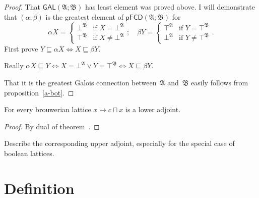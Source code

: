 \begin{proof}
That $\mathsf{GAL} (\mathfrak{A}; \mathfrak{B})$ has least element was proved
above. I will demonstrate that $(\alpha ; \beta)$
is the greatest element of $\mathsf{pFCD} (\mathfrak{A}; \mathfrak{B})$ for
\[ \alpha X = \begin{cases}
     \bot^{\mathfrak{B}} & \text{if } X = \bot^{\mathfrak{A}}\\
     \top^{\mathfrak{B}} & \text{if } X \neq \bot^{\mathfrak{A}}
   \end{cases} ; \quad
   \beta Y = \begin{cases}
     \top^{\mathfrak{A}} & \text{if } Y = \top^{\mathfrak{B}}\\
     \bot^{\mathfrak{A}} & \text{if } Y \neq \top^{\mathfrak{B}}
   \end{cases} . \]
First prove $Y \sqsubseteq \alpha X \Leftrightarrow X \sqsubseteq \beta Y$.

Really $\alpha X\sqsubseteq Y \Leftrightarrow X=\bot^{\mathfrak{A}}\lor Y=\top^{\mathfrak{B}} \Leftrightarrow X \sqsubseteq \beta Y$.

That it is the greatest Galois connection between~$\mathfrak{A}$ and~$\mathfrak{B}$ easily follows from proposition~\ref{a-bot}.
\end{proof}

\begin{thm}\label{gal-id-ex}
  For every brouwerian lattice $x \mapsto c \sqcap x$ is a lower adjoint.
\end{thm}

\begin{proof}
  By dual of theorem~.
\end{proof}

\begin{xca}
  Describe the corresponding upper adjoint, especially for the special case of
  boolean lattices.
\end{xca}

\section{Definition}

